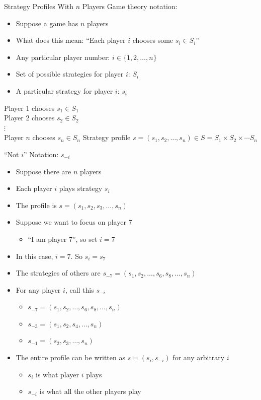 \begin{frame}{Strategy Profiles With $n$ Players}
Game theory notation:
\begin{itemize}
    \item Suppose a game has $n$ players
    \item What does this mean: ``Each player $i$ chooses some $s_i\in S_i$''
    \item Any particular player number:\hspace{0.5in} $i\in \{1,2,\ldots,n\}$
    \item Set of possible strategies for player $i$:\hspace{0.1in} $S_i$
    \item A particular strategy for player $i$:\hspace{0.42in} $s_i$
\end{itemize}
Player 1 chooses $s_1\in S_1$\\
Player 2 chooses $s_2\in S_2$\\
$\vdots$\\
Player $n$ chooses $s_n\in S_n$
\bsk
Strategy profile $s=(s_1,s_2,\ldots,s_n)\in S=S_1\times S_2\times \cdots S_n$
\end{frame}

\begin{frame}{``Not $i$'' Notation: $s_{-i}$}
\begin{itemize}
    \item Suppose there are $n$ players
    \item Each player $i$ plays strategy $s_i$
    \item The profile is $s=(s_1,s_2,s_3,\ldots,s_n)$
    \item Suppose we want to focus on player 7
    \begin{itemize}
        \item ``I am player 7'', so set $i=7$
    \end{itemize}
    \item In this case, $i=7$. So $s_i=s_7$
    \item The strategies of others are $s_{-7}=(s_1,s_2,\ldots,s_6,s_8,\ldots,s_n)$
    \item For any player $i$, call this $s_{-i}$
    \begin{itemize}
        \item $s_{-7}=(s_1,s_2,\ldots,s_6,s_8,\ldots,s_n)$
        \item $s_{-3}=(s_1,s_2,s_4,\ldots,s_n)$
        \item $s_{-1}=(s_2,s_3,\ldots,s_n)$
    \end{itemize}
    \item The entire profile can be written as $s=(s_i,s_{-i})$ for any arbitrary $i$
    \begin{itemize}
        \item $s_i$ is what player $i$ plays
        \item $s_{-i}$ is what all the other players play
    \end{itemize}
\end{itemize}
    
\end{frame}


